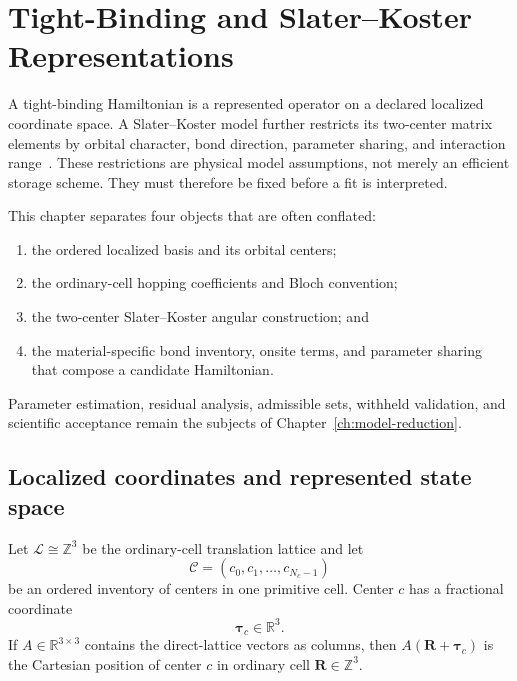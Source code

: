 \chapter{Tight-Binding and Slater--Koster Representations}

\label{ch:tight-binding-slater-koster}


A tight-binding Hamiltonian is a represented operator on a declared localized
coordinate space. A Slater--Koster model further restricts its two-center
matrix elements by orbital character, bond direction, parameter sharing, and
interaction range~\cite{slater1954,vogl1983}. These restrictions are physical
model assumptions, not merely an efficient storage scheme. They must therefore
be fixed before a fit is interpreted.

This chapter separates four objects that are often conflated:

\begin{enumerate}
  \item the ordered localized basis and its orbital centers;
  \item the ordinary-cell hopping coefficients and Bloch convention;
  \item the two-center Slater--Koster angular construction; and
  \item the material-specific bond inventory, onsite terms, and parameter
        sharing that compose a candidate Hamiltonian.
\end{enumerate}

Parameter estimation, residual analysis, admissible sets, withheld validation,
and scientific acceptance remain the subjects of
Chapter~\ref{ch:model-reduction}.

\section{Localized coordinates and represented state space}

Let $\mathcal L\cong\mathbb Z^3$ be the ordinary-cell translation lattice and
let
\begin{equation}
  \mathcal C=(c_0,c_1,\ldots,c_{N_c-1})
\end{equation}
be an ordered inventory of centers in one primitive cell. Center $c$ has a
fractional coordinate
\begin{equation}
  \boldsymbol\tau_c\in\mathbb R^3.
\end{equation}
If $A\in\mathbb R^{3\times3}$ contains the direct-lattice vectors as columns,
then $A(\mathbf R+\boldsymbol\tau_c)$ is the Cartesian position of center $c$
in ordinary cell $\mathbf R\in\mathbb Z^3$.

